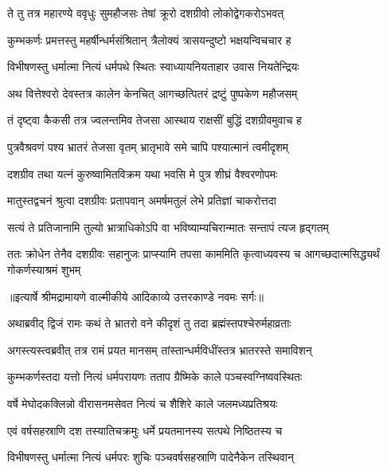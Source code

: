\twolineshloka
{ते तु तत्र महारण्ये ववृधुः सुमहौजसः}
{तेषां क्रूरो दशग्रीवो लोकोद्वेगकरोऽभवत्} %

\twolineshloka
{कुम्भकर्णः प्रमत्तस्तु महर्षीन्धर्मसंश्रितान्}
{त्रैलोक्यं त्रासयन्दुष्टो भक्षयन्विचचार ह} %

\twolineshloka
{विभीषणस्तु धर्मात्मा नित्यं धर्मपथे स्थितः}
{स्वाध्यायनियताहार उवास नियतेन्द्रियः} %

\twolineshloka
{अथ वित्तेश्वरो देवस्तत्र कालेन केनचित्}
{आगच्छत्पितरं द्रष्टुं पुष्पकेण महौजसम्} %

\twolineshloka
{तं दृष्ट्वा कैकसी तत्र ज्वलन्तमिव तेजसा}
{आस्थाय राक्षसीं बुद्धिं दशग्रीवमुवाच ह} %

\twolineshloka
{पुत्रवैश्रवणं पश्य भ्रातरं तेजसा वृतम्}
{भ्रातृभावे समे चापि पश्यात्मानं त्वमीदृशम्} %

\twolineshloka
{दशग्रीव तथा यत्नं कुरुष्वामितविक्रम}
{यथा भवसि मे पुत्र शीघ्रं वैश्वरणोपमः} %

\twolineshloka
{मातुस्तद्वचनं श्रुत्वा दशग्रीवः प्रतापवान्}
{अमर्षमतुलं लेभे प्रतिज्ञां चाकरोत्तदा} %

\twolineshloka
{सत्यं ते प्रतिजानामि तुल्यो भ्रात्राधिकोऽपि वा}
{भविष्याम्यचिरान्मातः सन्तापं त्यज हृद्गतम्} %

\threelineshloka
{ततः क्रोधेन तेनैव दशग्रीवः सहानुजः}
{प्राप्स्यामि तपसा काममिति कृत्वाध्यवस्य च}
{आगच्छदात्मसिद्ध्यर्थं गोकर्णस्याश्रमं शुभम्} %


{॥इत्यार्षे श्रीमद्रामायणे वाल्मीकीये आदिकाव्ये उत्तरकाण्डे नवमः सर्गः॥}


\twolineshloka
{अथाब्रवीद् द्विजं रामः कथं ते भ्रातरो वने}
{कीदृशं तु तदा ब्रह्मंस्तपश्चेरुर्महाव्रताः} %

\twolineshloka
{अगस्त्यस्त्वब्रवीत् तत्र रामं प्रयत मानसम्}
{तांस्तान्धर्मविधींस्तत्र भ्रातरस्ते समाविशन्} %

\twolineshloka
{कुम्भकर्णस्तदा यत्तो नित्यं धर्मपरायणः}
{तताप ग्रैष्मिके काले पञ्चस्वग्निष्ववस्थितः} %

\twolineshloka
{वर्षे मेघोदकक्लिन्नो वीरासनमसेवत}
{नित्यं च शैशिरे काले जलमध्यप्रतिश्रयः} %

\twolineshloka
{एवं वर्षसहस्राणि दश तस्यातिचक्रमुः}
{धर्मे प्रयतमानस्य सत्पथे निष्ठितस्य च} %

\twolineshloka
{विभीषणस्तु धर्मात्मा नित्यं धर्मपरः शुचिः}
{पञ्चवर्षसहस्राणि पादेनैकेन तस्थिवान्} %

